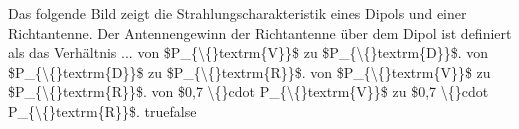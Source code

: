     {Das folgende Bild zeigt die Strahlungscharakteristik eines Dipols und einer Richtantenne. Der Antennengewinn der Richtantenne über dem Dipol ist definiert als das Verhältnis ...}
    {von \$P\_\{\textbackslash\{\}textrm\{V\}\}\$ zu \$P\_\{\textbackslash\{\}textrm\{D\}\}\$.}
    {von \$P\_\{\textbackslash\{\}textrm\{D\}\}\$ zu \$P\_\{\textbackslash\{\}textrm\{R\}\}\$.}
    {von \$P\_\{\textbackslash\{\}textrm\{V\}\}\$ zu \$P\_\{\textbackslash\{\}textrm\{R\}\}\$.}
    {von \$0,7 \textbackslash\{\}cdot P\_\{\textbackslash\{\}textrm\{V\}\}\$ zu \$0,7 \textbackslash\{\}cdot P\_\{\textbackslash\{\}textrm\{R\}\}\$.}
    {true}{false}